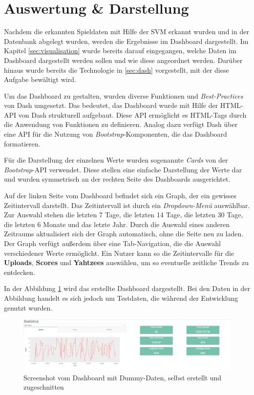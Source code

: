 \section{Auswertung \& Darstellung} \label{sec:dashboard}
Nachdem die erkannten Spieldaten mit Hilfe der SVM erkannt wurden und in der Datenbank abgelegt wurden, werden die Ergebnisse im Dashboard dargestellt. Im Kapitel \ref{sec:visualisation} wurde bereits darauf eingegangen, welche Daten im Dashboard dargestellt werden sollen und wie diese angeordnet werden. Darüber hinaus wurde bereits die Technologie in \ref{sec:dash} vorgestellt, mit der diese Aufgabe bewältigt wird.

Um das Dashboard zu gestalten, wurden diverse Funktionen und \textit{Best-Practices} von Dash umgesetzt. Das bedeutet, das Dashboard wurde mit Hilfe der HTML-API von Dash strukturell aufgebaut. Diese API ermöglicht es HTML-Tags durch die Anwendung von Funktionen zu definieren. Analog dazu verfügt Dash über eine API für die Nutzung von \textit{Bootstrap}-Komponenten, die das Dashboard formatieren. \cite{plotly}

Für die Darstellung der einzelnen Werte wurden sogenannte \textit{Cards} von der \textit{Bootstrap}-API verwendet. Diese stellen eine einfache Darstellung der Werte dar und wurden symmetrisch an der rechten Seite des Dashboards ausgerichtet.

Auf der linken Seite vom Dashboard befindet sich ein Graph, der ein gewisses Zeitintervall darstellt. Das Zeitintervall ist durch ein \textit{Dropdown-Menü} auswählbar. Zur Auswahl stehen die letzten 7 Tage, die letzten 14 Tage, die letzten 30 Tage, die letzten 6 Monate und das letzte Jahr. Durch die Auswahl eines anderen Zeitraums aktualisiert sich der Graph automatisch, ohne die Seite neu zu laden.
Der Graph verfügt außerdem über eine Tab-Navigation, die die Auswahl verschiedener Werte ermöglicht. Ein Nutzer kann so die Zeitintervalle für die \textbf{Uploads}, \textbf{Scores} und \textbf{Yahtzees} auswählen, um so eventuelle zeitliche Trends zu entdecken.

In der Abbildung \ref{fig:dashboard} wird das erstellte Dashboard dargestellt. Bei den Daten in der Abbildung handelt es sich jedoch um Testdaten, die während der Entwicklung genutzt wurden. 

\begin{figure}[H]
	\centering
	\includegraphics[width=\imgMed]{images/practice/screenshot_dashboard.png}
	\caption{Screenshot vom Dashboard mit Dummy-Daten, selbst erstellt und zugeschnitten}
	\label{fig:dashboard}
\end{figure}

